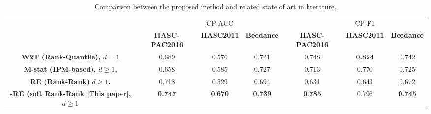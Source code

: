 \documentclass{article}
\begin{document}

\begin{table*}[ht]
\centering
\setlength\tabcolsep{1.5pt}
\begin{tabular}{c|ccc||ccc}
\hline
      &              & CP-AUC   &          &              & CP-F1    &          \\
      &{\small \textbf{HASC-PAC2016}} & {\small \textbf{HASC2011}} & {\small \textbf{Beedance}} & {\small \textbf{HASC-PAC2016}} & {\small \textbf{HASC2011}} & {\small \textbf{Beedance}}  \\ \hline \rule{0pt}{3ex}
\textbf{W2T (Rank-Quantile), $d=1$ \cite{cheng2020optimal}}   & 0.689        & 0.576    & 0.721    & 0.748        & \textbf{0.824}    & 0.742    \\
\textbf{M-stat (IPM-based), $d\geq 1$, \cite{li2015scan}}  & 0.658        & 0.585    & 0.727    & 0.713        & 0.770    & 0.725   \\
\textbf{RE (Rank-Rank) $d \geq 1$, \cite{deb2021multivariate}}    & 0.718       & 0.529    & 0.694    & 0.631       & 0.643    &  0.672       \\
\textbf{sRE (soft Rank-Rank [This paper], $d \geq 1$}   & \textbf{0.747}        & \textbf{0.670}    & \textbf{0.739}    & \textbf{0.785}       & 0.796    & \textbf{0.745}       \\ \hline
\end{tabular}
\caption{Comparison between the proposed method and related state of art in literature.}
\vspace{-5mm}
\label{tab:result}
\end{table*}
\vspace{-5mm}
\end{document}
